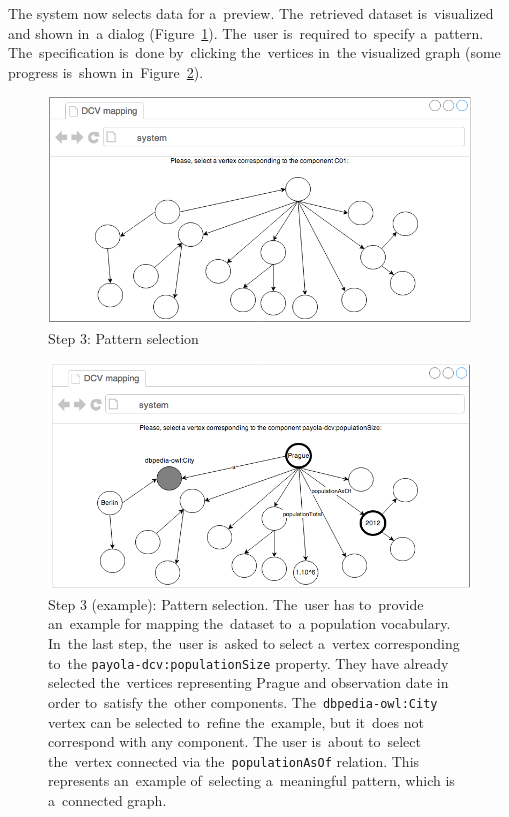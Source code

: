The system now selects data for a~preview. The~retrieved dataset is~visualized and shown in~a dialog (Figure~\ref{fig:mockup-03}). The~user is~required to~specify a~pattern. The~specification is~done by~clicking the~vertices in~the visualized graph (some progress is~shown in~Figure~\ref{fig:mockup-05}).

\begin{figure}
	\centering
	\includegraphics[width=120mm]{img/mockup-03.png}
	\caption{Step 3: Pattern selection}
	\label{fig:mockup-03}
\end{figure}
\begin{figure}
	\centering
	\includegraphics[width=120mm]{img/mockup-05.png}
	\caption{Step 3 (example): Pattern selection. The~user has to~provide an~example
	for mapping the~dataset to~a population vocabulary. In~the last step, the~user is~asked
	to select a~vertex corresponding to~the \texttt{payola-dcv:populationSize} property.
	They have already selected the~vertices representing Prague and observation date
	in order to~satisfy the~other components. The~\texttt{dbpedia-owl:City} vertex can
	be selected to~refine the~example, but it~does not correspond with any component.
	The user is~about to~select the~vertex connected via the~\texttt{populationAsOf} 
	relation. This represents an~example of~selecting a~meaningful pattern, which 
	is a~connected graph.}
	\label{fig:mockup-05}
\end{figure}

